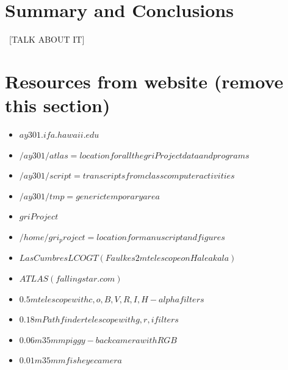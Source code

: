 \documentclass[aps,prl,twocolumn,superscriptaddress]{revtex4-1}
\begin{document}
\section{Summary and Conclusions}
~[TALK ABOUT IT]


\section{Resources from website (remove this section)}
\begin{itemize}
	\item{} $ay301.ifa.hawaii.edu$
	\item{} $/ay301/atlas = location for all the gri Project data and programs$
	\item{} $/ay301/script = transcripts from class computer activities$
	\item{} $/ay301/tmp = generic temporary area$
	\item{} $gri Project$
	\item{} $/home/gri_project = location for manuscript and figures$
	\item{} $Las Cumbres LCOGT (Faulkes 2m telescope on Haleakala)$
	\item{} $ATLAS (fallingstar.com)$
	\item{} $0.5m telescope with c,o,B,V,R,I,H-alpha filters$
	\item{} $0.18m Pathfinder telescope with g,r,i filters$
	\item{} $0.06m 35mm piggy-back camera with RGB$
	\item{} $0.01m 35mm fisheye camera$
\end{itemize}



\setlength{\parindent}{0cm}

\begin{thebibliography}{99}  %


\end{thebibliography}
\end{document}
